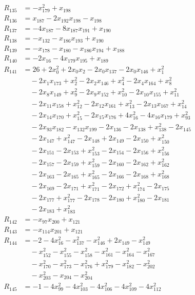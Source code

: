 \begin{align*}
R_{135}&=-x_{179}^{2}+x_{198}\\
R_{136}&=x_{187}-2x_{192}x_{198}-x_{198}\\
R_{137}&=-4x_{187}-8x_{187}x_{191}+x_{190}\\
R_{138}&=-x_{132}-x_{186}x_{193}+x_{190}\\
R_{139}&=-x_{178}-x_{180}-x_{186}x_{194}+x_{188}\\
R_{140}&=-2x_{16}-4x_{179}x_{195}+x_{189}\\
R_{141}&=26+2x_{0}^{2}+2x_{0}x_{2}-2x_{0}x_{137}-2x_{0}x_{146}+x_{1}^{2}\\
&\quad{}-2x_{1}x_{173}+x_{2}^{2}-2x_{2}x_{146}+x_{4}^{2}-2x_{4}x_{164}+x_{8}^{2}\\
&\quad{}-2x_{8}x_{149}+x_{9}^{2}-2x_{9}x_{152}+x_{10}^{2}-2x_{10}x_{155}+x_{11}^{2}\\
&\quad{}-2x_{11}x_{158}+x_{12}^{2}-2x_{12}x_{161}+x_{13}^{2}-2x_{13}x_{167}+x_{14}^{2}\\
&\quad{}-2x_{14}x_{170}+x_{15}^{2}-2x_{15}x_{176}+4x_{16}^{2}-4x_{16}x_{179}+x_{93}^{2}\\
&\quad{}-2x_{93}x_{182}-x_{132}x_{199}-2x_{136}-2x_{138}+x_{138}^{2}-2x_{145}\\
&\quad{}-2x_{147}+x_{147}^{2}-2x_{148}+2x_{149}-2x_{150}+x_{150}^{2}\\
&\quad{}-2x_{151}-2x_{153}+x_{153}^{2}-2x_{154}-2x_{156}+x_{156}^{2}\\
&\quad{}-2x_{157}-2x_{159}+x_{159}^{2}-2x_{160}-2x_{162}+x_{162}^{2}\\
&\quad{}-2x_{163}-2x_{165}+x_{165}^{2}-2x_{166}-2x_{168}+x_{168}^{2}\\
&\quad{}-2x_{169}-2x_{171}+x_{171}^{2}-2x_{172}+x_{174}^{2}-2x_{175}\\
&\quad{}-2x_{177}+x_{177}^{2}-2x_{178}-2x_{180}+x_{180}^{2}-2x_{181}\\
&\quad{}-2x_{183}+x_{183}^{2}\\
R_{142}&=-x_{97}x_{200}+x_{121}\\
R_{143}&=-x_{114}x_{201}+x_{121}\\
R_{144}&=-2-4x_{16}^{2}-x_{137}^{2}-x_{146}^{2}+2x_{149}-x_{149}^{2}\\
&\quad{}-x_{152}^{2}-x_{155}^{2}-x_{158}^{2}-x_{161}^{2}-x_{164}^{2}-x_{167}^{2}\\
&\quad{}-x_{170}^{2}-x_{173}^{2}-x_{176}^{2}+x_{179}^{2}-x_{182}^{2}-x_{202}^{2}\\
&\quad{}-x_{203}^{2}-x_{204}-x_{204}^{2}\\
R_{145}&=-1-4x_{99}^{2}-4x_{103}^{2}-4x_{106}^{2}-4x_{109}^{2}-4x_{112}^{2}\\

\end{align*}
